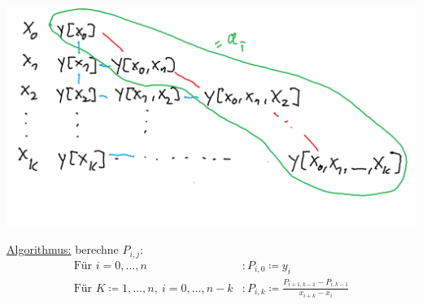 \begin{question}
    \begin{center}
        \includegraphics[width=\linewidth]{Bilder/071122_1.png}\\
    \end{center}
\underline{Algorithmus:} berechne $P_{i,j}$:\begin{align*}
    \text{Für }i=0,\dots,n&: P_{i,0} \coloneqq y_i\\
    \text{Für }K\coloneqq 1,\dots,n, \ i=0,\dots,n-k&: P_{i,k} \coloneqq \frac{P_{i+1, k-1}-P_{i,k-1}}{x_{i+k}-x_i}
\end{align*}
\end{question}

